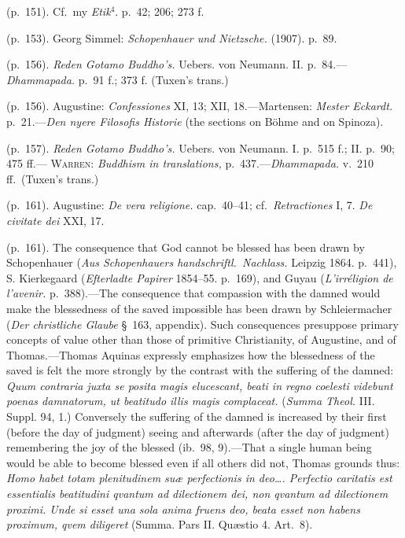 \documentclass[12pt,a4paper]{book}
\begin{document}
 (p.~151). Cf.\ my \emph{Etik}$^4$. p.~42; 206; 273 f.

 (p.~153). Georg Simmel: \emph{Schopenhauer und Nietzsche.} (1907). p.~89.

 (p.~156). \emph{Reden Gotamo Buddho's.} Uebers. von Neumann. II. p.~84.---\emph{Dhammapada.} p.~91 f.;
373 f. (Tuxen's trans.)

 (p.~156). Augustine: \emph{Confessiones} XI, 13; XII, 18.---Martensen: \emph{Mester Eckardt.}
p.~21.---\emph{Den nyere Filosofis Historie} (the sections on Böhme and on Spinoza).

 (p.~157). \emph{Reden Gotamo Buddho's.} Uebers. von Neumann. I. p.~515 f.; II. p.~90; 475 ff.---%
\textsc{Warren}: \emph{Buddhism in translations,} p.~437.---\emph{Dhammapada.} v.~210 ff.\ (Tuxen's
trans.)

 (p.~161). Augustine: \emph{De vera religione.} cap.~40--41; cf.\ \emph{Retractiones} I, 7. \emph{De
civitate dei} XXI, 17.

 (p.~161). The consequence that God cannot be blessed has been drawn by Schopenhauer (\emph{Aus
Schopenhauers handschriftl.\ Nachlass.} Leipzig 1864. p.~441), S. Kierkegaard (\emph{Efterladte
Papirer} 1854--55. p.~169), and Guyau (\emph{L'irréligion de l'avenir.} p.~388).---The consequence that
compassion with the damned would make the blessedness of the saved impossible has been drawn by
Schleiermacher (\emph{Der christliche Glaube} §~163, appendix). Such consequences presuppose primary
concepts of value other than those of primitive Christianity, of Augustine, and of Thomas.---Thomas
Aquinas expressly emphasizes how the blessedness of the saved is felt the more strongly by the contrast
with the suffering of the damned: \emph{Quum contraria juxta se posita magis elucescant, beati in regno
coelesti videbunt poenas damnatorum, ut beatitudo illis magis complaceat.} (\emph{Summa Theol.} III.
Suppl. 94, 1.) Conversely the suffering of the damned is increased by their first (before the day of
judgment) seeing and afterwards (after the day of judgment) remembering the joy of the blessed (ib.\ 98,
9).---That a single human being would be able to become blessed even if all others did not, Thomas
grounds thus: \emph{Homo habet totam plenitudinem suæ perfectionis in deo\ldots. Perfectio caritatis est
essentialis beatitudini qvantum ad dilectionem dei, non qvantum ad dilectionem proximi. Unde si esset
una sola anima fruens deo, beata esset non habens proximum, qvem diligeret} (Summa. Pars II. Quæstio 4.
Art.~8).
\end{document}
